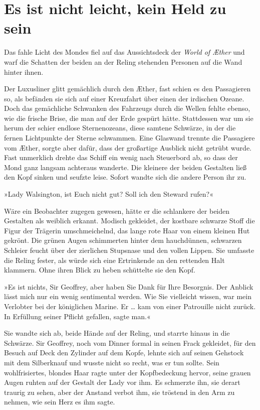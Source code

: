 \section{Es ist nicht leicht, kein Held zu sein}
Das fahle Licht des Mondes fiel auf das Aussichtsdeck der \textit{World of
Æther} und warf die Schatten der beiden an der Reling stehenden
Personen auf die Wand hinter ihnen.

Der Luxusliner glitt gemächlich durch den Æther, fast schien es den
Passagieren so, als befänden sie sich auf einer Kreuzfahrt über
einen der irdischen Ozeane. Doch das gemächliche Schwanken des
Fahrzeugs durch die Wellen fehlte ebenso, wie die frische Brise,
die man auf der Erde gespürt hätte. Stattdessen war um sie herum
der schier endlose Sternenozeans, diese samtene Schwärze, in der
die fernen Lichtpunkte der Sterne schwammen. Eine Glaswand trennte
die Passagiere vom Æther, sorgte aber dafür, dass der großartige
Ausblick nicht getrübt wurde. Fast unmerklich drehte das Schiff ein
wenig nach Steuerbord ab, so dass der Mond ganz langsam achteraus
wanderte. Die kleinere der beiden Gestalten ließ den Kopf sinken
und seufzte leise. Sofort wandte sich die andere Person ihr zu.

\bigpar

»Lady Walsington, ist Euch nicht gut? Soll ich den Steward rufen?«

\bigpar

Wäre ein Beobachter zugegen gewesen, hätte er die schlankere der
beiden Gestalten als weiblich erkannt. Modisch gekleidet, der
kostbare schwarze Stoff die Figur der Trägerin umschmeichelnd, das
lange rote Haar von einem kleinen Hut gekrönt. Die grünen Augen
schimmerten hinter dem hauchdünnen, schwarzen Schleier feucht über
der zierlichen Stupsnase und den vollen Lippen. Sie umfasste die
Reling fester, als würde sich eine Ertrinkende an den rettenden
Halt klammern. Ohne ihren Blick zu heben schüttelte sie den Kopf.

»Es ist nichts, Sir Geoffrey, aber haben Sie Dank für Ihre
Besorgnis. Der Anblick lässt mich nur ein wenig sentimental werden.
Wie Sie vielleicht wissen, war mein Verlobter bei der königlichen
Marine. Er \ldots{} kam von einer Patrouille nicht zurück. In Erfüllung
seiner Pflicht gefallen, sagte man.«

Sie wandte sich ab, beide Hände auf der Reling, und starrte hinaus
in die Schwärze. Sir Geoffrey, noch vom Dinner formal in seinen
Frack gekleidet, für den Besuch auf Deck den Zylinder auf dem
Kopfe, lehnte sich auf seinen Gehstock mit dem Silberknauf und
wusste nicht so recht, was er tun sollte. Sein wohlfrisiertes,
blondes Haar ragte unter der Kopfbedeckung hervor, seine grauen
Augen ruhten auf der Gestalt der Lady vor ihm. Es schmerzte ihn,
sie derart traurig zu sehen, aber der Anstand verbot ihm, sie
tröstend in den Arm zu nehmen, wie sein Herz es ihm sagte.

